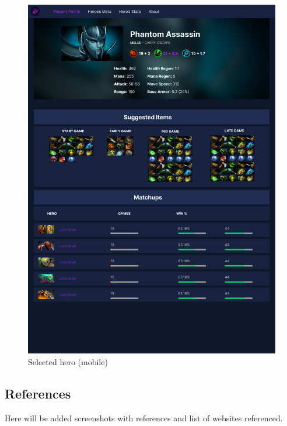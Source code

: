 \begin{figure}[h]
\begin{minipage}[t]{0.48\textwidth}
            \includegraphics[width=\textwidth]{images/SelectedHero_m}
            \caption{Selected hero (mobile)}
        \end{minipage}
    \end{figure}



\subsection{References}

Here will be added screenshots with references and list of websites referenced.


